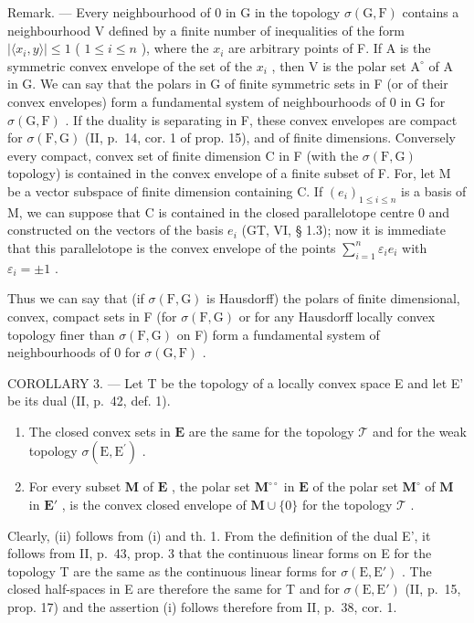 Remark. --- Every neighbourhood of 0 in G in the topology \(\sigma(\mathrm{G},\mathrm{F})\) contains a neighbourhood V defined by a finite number of inequalities of the form \(|\langle x_i,y\rangle |\leqslant 1\) ( \(1\leqslant i\leqslant n\) ), where the \(x_{i}\) are arbitrary points of F. If A is the symmetric convex envelope of the set of the \(x_{i}\) , then V is the polar set \(\mathrm{A}^{\circ}\) of A in G. We can say that the polars in G of finite symmetric sets in F (or of their convex envelopes) form a fundamental system of neighbourhoods of 0 in G for \(\sigma(\mathrm{G},\mathrm{F})\) . If the duality is separating in F, these convex envelopes are compact for \(\sigma(\mathrm{F},\mathrm{G})\) (II, p.~14, cor. 1 of prop. 15), and of finite dimensions. Conversely every compact, convex set of finite dimension C in F (with the \(\sigma(\mathrm{F},\mathrm{G})\) topology) is contained in the convex envelope of a finite subset of F. For, let M be a vector subspace of finite dimension containing C. If \((e_i)_{1\leqslant i\leqslant n}\) is a basis of M, we can suppose that C is contained in the closed parallelotope centre 0 and constructed on the vectors of the basis \(e_i\) (GT, VI, § 1.3); now it is immediate that this parallelotope is the convex envelope of the points \(\sum_{i=1}^{n} \varepsilon_i e_i\) with \(\varepsilon_i = \pm 1\) .

Thus we can say that (if \(\sigma(\mathrm{F},\mathrm{G})\) is Hausdorff) the polars of finite dimensional, convex, compact sets in F (for \(\sigma(\mathrm{F},\mathrm{G})\) or for any Hausdorff locally convex topology finer than \(\sigma(\mathrm{F},\mathrm{G})\) on F) form a fundamental system of neighbourhoods of 0 for \(\sigma(\mathrm{G},\mathrm{F})\) .

COROLLARY 3. --- Let T be the topology of a locally convex space E and let E' be its dual (II, p.~42, def. 1).

\begin{enumerate}
\def\labelenumi{(\roman{enumi})}
\item
  The closed convex sets in \(\mathbf{E}\) are the same for the topology \(\mathcal{T}\) and for the weak topology \(\sigma (\mathrm{E},\mathrm{E}^{\prime})\) .
\item
  For every subset \(\mathbf{M}\) of \(\mathbf{E}\) , the polar set \(\mathbf{M}^{\circ \circ}\) in \(\mathbf{E}\) of the polar set \(\mathbf{M}^{\circ}\) of \(\mathbf{M}\) in \(\mathbf{E}'\) , is the convex closed envelope of \(\mathbf{M} \cup \{0\}\) for the topology \(\mathcal{T}\) .
\end{enumerate}

Clearly, (ii) follows from (i) and th. 1. From the definition of the dual E', it follows from II, p.~43, prop. 3 that the continuous linear forms on E for the topology T are the same as the continuous linear forms for \(\sigma(\mathrm{E}, \mathrm{E}')\) . The closed half-spaces in E are therefore the same for T and for \(\sigma(\mathrm{E}, \mathrm{E}')\) (II, p.~15, prop. 17) and the assertion (i) follows therefore from II, p.~38, cor. 1.

